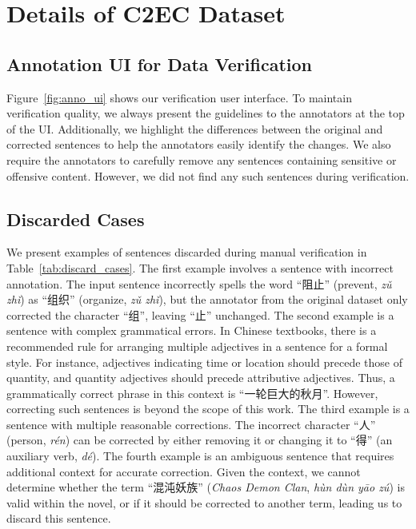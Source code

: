 \appendix

\section{Details of C2EC Dataset}
\subsection{Annotation UI for Data Verification}
\label{sec:anno_ui}

Figure~\ref{fig:anno_ui} shows our verification user interface.
To maintain verification quality, we always present the guidelines to the annotators at the top of the UI.
Additionally, we highlight the differences between the original and corrected sentences to help the annotators easily identify the changes.
We also require the annotators to carefully remove any sentences containing sensitive or offensive content.
However, we did not find any such sentences during verification.

\subsection{Discarded Cases}
\label{sec:discard_cases}

We present examples of sentences discarded during manual verification in Table~\ref{tab:discard_cases}.
The first example involves a sentence with incorrect annotation.
The input sentence incorrectly spells the word ``阻止'' (prevent, \textit{zǔ zhǐ}) as ``组织'' (organize, \textit{zǔ zhǐ}), but the annotator from the original dataset only corrected the character ``组'', leaving ``止'' unchanged.
The second example is a sentence with complex grammatical errors.
In Chinese textbooks, there is a recommended rule for arranging multiple adjectives in a sentence for a formal style.
For instance, adjectives indicating time or location should precede those of quantity, and quantity adjectives should precede attributive adjectives.
Thus, a grammatically correct phrase in this context is ``一轮巨大的秋月''.
However, correcting such sentences is beyond the scope of this work.
The third example is a sentence with multiple reasonable corrections.
The incorrect character ``人'' (person, \textit{rén}) can be corrected by either removing it or changing it to ``得'' (an auxiliary verb, \textit{dé}).
The fourth example is an ambiguous sentence that requires additional context for accurate correction.
Given the context, we cannot determine whether the term ``混沌妖族'' (\textit{Chaos Demon Clan}, \textit{hùn dùn yāo zú}) is valid within the novel, or if it should be corrected to another term, leading us to discard this sentence.

